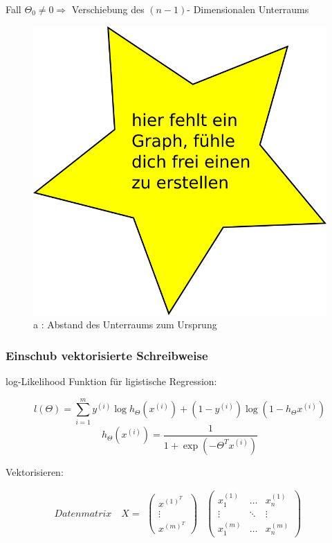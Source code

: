 			 Fall $ \Theta_0 \neq 0 \Rightarrow$ Verschiebung des $ (n-1) $- Dimensionalen Unterraums
			
			\begin{figure}
				\centering
				\includegraphics[width=0.7\linewidth]{graphs/dummy}
				\caption{a : Abstand des Unterraums zum Ursprung}
			\end{figure}
			
			\subsubsection*{Einschub vektorisierte Schreibweise}
			 log-Likelihood Funktion für ligistische Regression:
			
			\[ l(\Theta) = \sum_{i = 1}^{m} y^{(i)} \log h_\Theta (x^{(i)}) + (1 - y^{(i)}) \log(1 - h_\Theta x^{(i)})\]
			\[ h_\Theta (x^{(i)})  = \frac{1}{1 + \exp(- \Theta^T x^{(i)})}\]
			
			 Vektorisieren:
			
			\[Datenmatrix \quad	X = 
				\begin{matrix} \begin{pmatrix} x^{(1)^T} \\ \vdots \\ x^{(m)^T}	\end{pmatrix}  \end{matrix}
				\begin{matrix} \begin{pmatrix} x_1^{(1)} & \dots & x_n^{(1)} \\ \vdots & \ddots & \vdots \\ x_1^{(m)}	& \dots & x_n^{(m)}\end{pmatrix}  \end{matrix} \]
				

